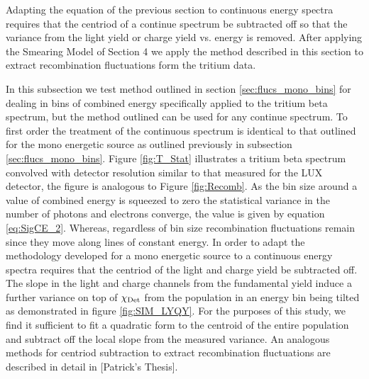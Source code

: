 Adapting the equation of the previous section to continuous energy spectra requires that the centriod of a continue spectrum be subtracted off so that the variance from the light yield or charge yield vs. energy is removed. After applying the Smearing Model of Section 4 we apply the method described in this section to extract recombination fluctuations form the tritium data.

In this subsection we test method outlined in section \ref{sec:flucs_mono_bins} for dealing in bins of combined energy specifically applied to the tritium beta spectrum, but the method outlined can be used for any continue spectrum. To first order the treatment of the continuous spectrum is identical to that outlined for the mono energetic source as outlined previously in subsection \ref{sec:flucs_mono_bins}. Figure \ref{fig:T_Stat} illustrates a tritium beta spectrum convolved with detector resolution similar to that measured for the LUX detector, the figure is analogous to Figure \ref{fig:Recomb}. As the bin size around a value of combined energy is squeezed to zero the statistical variance in the number of photons and electrons converge, the value is given by equation \ref{eq:SigCE_2}. Whereas, regardless of bin size recombination fluctuations remain since they move along lines of constant energy. In order to adapt the methodology developed for a mono energetic source to a continuous energy spectra requires that the centriod of the light and charge yield be subtracted off. The slope in the light and charge channels from the fundamental yield  induce a further variance on top of $\rm \chi_{Det}$ from the population in an energy bin being tilted as demonstrated in figure \ref{fig:SIM_LYQY}. For the purposes of this study, we find it sufficient to fit a quadratic form to the centroid of the entire population and subtract off the local slope from the measured variance. An analogous methods for centriod subtraction to extract recombination fluctuations are described in detail in [Patrick's Thesis].



